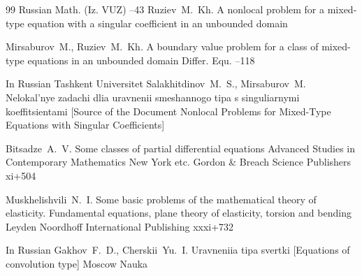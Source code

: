 \begin{thebibliography}{99}
\jour Russian Math. (Iz. VUZ)
--43
\by Ruziev~M.~Kh.
\paper A nonlocal problem for a mixed-type equation with a singular coefficient in an unbounded domain


\by Mirsaburov~M., Ruziev~M.~Kh.
\paper A boundary value problem for a class of mixed-type equations in an unbounded domain
\jour Differ. Equ. 
--118 



\lang In Russian
\publaddr Tashkent
\publ Universitet
\by Salakhitdinov~M.~S., Mirsaburov~M.
\book Nelokal'nye zadachi dlia uravnenii smeshannogo tipa s singuliarnymi koeffitsientami \rm [Source of the Document Nonlocal Problems for Mixed-Type Equations with Singular Coefficients]


\by Bitsadze~A.~V.
\book Some classes of partial differential equations
\serial Advanced Studies in Con\-tem\-po\-rary Mathematics
\publaddr New York etc.
\publ Gordon \& Breach Science Publishers
\totalpages xi+504 



\by Muskhelishvili~N.~I.
\book Some basic problems of the mathematical theory of elasticity. Fun\-damen\-tal equations, plane theory of elasticity, torsion and bending
\publaddr Leyden
\publ Noordhoff International Publishing
\totalpages xxxi+732 


\lang In Russian
\by Gakhov~F.~D., Cherskii~Yu.~I.
\book Uravneniia tipa svertki \rm [Equations of convolution type]
\publaddr Moscow
\publ Nauka 




\end{thebibliography}


\EngDate	


\newpage \Russian

%


